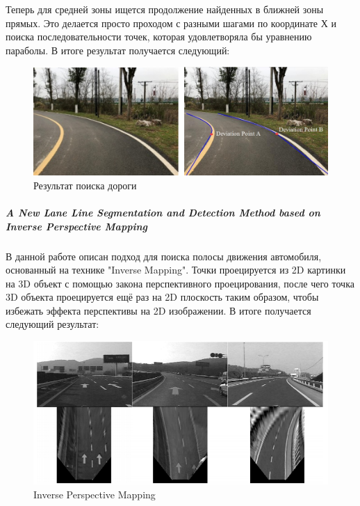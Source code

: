 Теперь для средней зоны ищется продолжение найденных в ближней зоны прямых.
Это делается просто проходом с разными шагами по координате Х и поиска последовательности точек, которая удовлетворяла бы уравнению параболы. В итоге результат получается следующий:
\begin{figure}[h!]
	\centering
	\includegraphics[width=1\linewidth]{pictures/screenshot029}
	\caption{Результат поиска дороги}
	\label{fig:screenshot029}
\end{figure}

\subparagraph{A New Lane Line Segmentation and Detection Method based on Inverse Perspective Mapping\cite{b:inverse_mapping}}
В данной работе описан подход для поиска полосы движения автомобиля, основанный на технике "Inverse Mapping". Точки проецируется из 2D картинки на 3D объект с помощью закона перспективного проецирования\cite{b:projection}, после чего точка 3D объекта проецируется ещё раз на 2D плоскость таким образом, чтобы избежать эффекта перспективы на 2D изображении. В итоге получается следующий результат:
\begin{figure}[h!]
	\centering
	\includegraphics[width=0.7\linewidth]{pictures/screenshot23234}
	\caption{Inverse Perspective Mapping}
	\label{fig:screenshot23234}
\end{figure}


